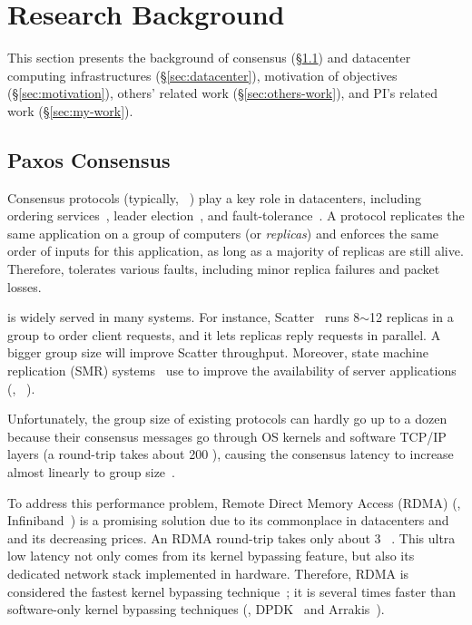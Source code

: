 \vspace{-.15in}\section{Research Background} 
\label{sec:background}\vspace{-.075in}

This section presents the background of consensus (\S\ref{sec:consensus}) and 
datacenter computing infrastructures (\S\ref{sec:datacenter}), motivation of 
objectives (\S\ref{sec:motivation}), others' related work 
(\S\ref{sec:others-work}), and PI's related work (\S\ref{sec:my-work}).

\vspace{-.15in}\subsection{Paxos Consensus} 
\label{sec:consensus}\vspace{-.075in}

Consensus protocols (typically, 
\paxos~\cite{paxos:practical,paxos,paxos:simple,paxos:complex}) play a 
key role in datacenters, including ordering 
services~\cite{ellis:thesis,manos:hotdep10,scatter:sosp11},
leader election~\cite{zookeeper, chubby:osdi}, and
fault-tolerance~\cite{eve:osdi12,rex:eurosys14,crane:sosp15}. A \paxos protocol
replicates the same application on a group of computers (or \emph{replicas}) 
and enforces the same order of inputs for this application, as long as 
a majority of replicas are still alive. Therefore, \paxos tolerates 
various faults, including minor replica failures and packet losses.

\paxos is widely served in many systems. For instance, 
Scatter~\cite{scatter:sosp11} runs 8$\sim$12 replicas in a
\paxos group to order client requests, and it lets replicas reply requests
in parallel. A bigger group size will improve Scatter throughput. 
Moreover, state machine replication (SMR) 
systems~\cite{eve:osdi12,rex:eurosys14,crane:sosp15} use \paxos to 
improve the availability of server applications (\eg, \mysql~\cite{mysql}).

Unfortunately, the group size of existing \paxos protocols can hardly go up 
to a dozen because their consensus messages go through OS kernels and software 
TCP/IP layers (a round-trip takes about 200 \us), causing the consensus 
latency to increase almost linearly to 
group size~\cite{scatter:sosp11,zookeeper,crane:sosp15}.

To address this \paxos performance problem, Remote Direct Memory Access (RDMA) 
(\eg, Infiniband~\cite{infiniband}) is a promising solution due to its 
commonplace in datacenters and and its decreasing prices. An RDMA round-trip 
takes only about 3 \us~\cite{pilaf:usenix14}. This ultra low latency not only 
comes from its kernel bypassing feature, but also its dedicated network stack 
implemented in hardware. Therefore, RDMA is considered the fastest kernel 
bypassing technique~\cite{herd:sigcomm14,pilaf:usenix14,dare:hpdc15}; it is 
several times faster than software-only kernel bypassing techniques (\eg, 
DPDK~\cite{dpdk} and Arrakis~\cite{arrakis:osdi14}).

